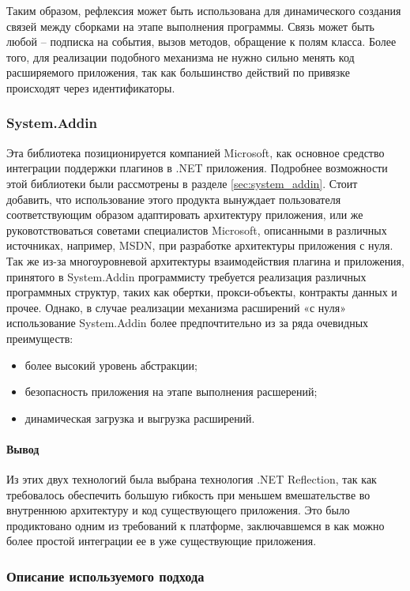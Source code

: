 Таким образом, рефлексия может быть использована для динамического создания связей между сборками на этапе выполнения программы. Связь может быть любой – подписка на события, вызов методов, обращение к полям класса. Более того, для реализации подобного механизма не нужно сильно менять код расширяемого приложения, так как большинство действий по привязке происходят через идентификаторы.

\subsubsection{System.Addin}

Эта библиотека позиционируется компанией Microsoft, как основное средство интеграции поддержки плагинов в .NET приложения. Подробнее возможности этой библиотеки были рассмотрены в разделе \ref{sec:system_addin}. Стоит добавить, что использование этого продукта вынуждает пользователя соответствующим образом адаптировать архитектуру приложения, или же руковотствоваться советами специалистов Microsoft, описанными в различных источниках, например, MSDN, при разработке архитектуры приложения с нуля. Так же из-за многоуровневой архитектуры взаимодействия плагина и приложения, принятого в System.Addin программисту требуется реализация различных программных структур, таких как обертки, прокси-объекты, контракты данных и прочее. Однако, в случае реализации механизма расширений «с нуля» использование System.Addin более предпочтительно из за ряда очевидных преимуществ:

\begin{itemize}
  \item более высокий уровень абстракции;
  \item безопасность приложения на этапе выполнения расшерений;
  \item динамическая загрузка и выгрузка расширений.
\end{itemize}

\paragraph{Вывод}

Из этих двух технологий была выбрана технология .NET Reflection, так как требовалось обеспечить большую гибкость при меньшем вмешательстве во внутреннюю архитектуру и код существующего приложения. Это было продиктовано одним из требований к платформе, заключавшемся в как можно более простой интеграции ее в уже существующие приложения.

\subsubsection{Описание используемого подхода}


